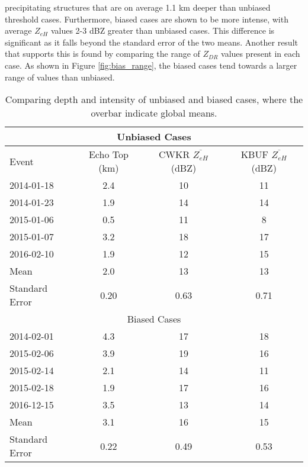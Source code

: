 precipitating structures that are on average 1.1 km deeper than unbiased threshold
cases. Furthermore, biased cases are shown to be more intense, with average $Z_{eH}$ values 2-3 dBZ greater 
than unbiased cases. This difference is significant as it falls beyond the standard error of the two means. 
Another result that supports this is found by comparing the range of $Z_{DR}$ values present in each case. As 
shown in Figure \ref{fig:bias_range}, the biased cases tend towards a larger range of values than unbiased. 
\begin{table}[H]
    \caption{Comparing depth and intensity of unbiased and biased cases, where the overbar indicate global means.}\label{diagnosebias}
    \begin{center}
    \begin{tabular}{|l|c|c|c|}
    \hline
    \multicolumn{4}{|c|}{Unbiased Cases} \\
    \hline
     Event & Echo Top (km) & CWKR $\overline{Z_{eH}}$ (dBZ) & KBUF $\overline{Z_{eH}}$ (dBZ)\\
    \hline\hline
    2014-01-18 & 2.4 & 10 & 11 \\
    \hline
    2014-01-23 & 1.9 & 14 & 14 \\
    \hline
    2015-01-06 & 0.5 & 11 & 8 \\
    \hline
    2015-01-07 & 3.2 & 18 & 17 \\ 
    \hline
    2016-02-10 & 1.9 & 12 & 15 \\ 
    \hline\hline
    Mean & 2.0 & 13 & 13 \\
    \hline
    Standard Error & 0.20 & 0.63 & 0.71 \\
    \hline
    \multicolumn{4}{|c|}{Biased Cases} \\
    \hline\hline
    2014-02-01 & 4.3 & 17 & 18\\
    \hline
    2015-02-06 & 3.9 & 19 & 16\\
    \hline
    2015-02-14 & 2.1 & 14 & 11\\
    \hline
    2015-02-18 & 1.9 & 17 & 16\\ 
    \hline
    2016-12-15 & 3.5 & 13 & 14  \\ 
    \hline\hline
    Mean & 3.1 & 16 & 15 \\
    \hline
    Standard Error & 0.22 & 0.49 & 0.53 \\
    \hline
    \end{tabular}
    \end{center}
\end{table}

